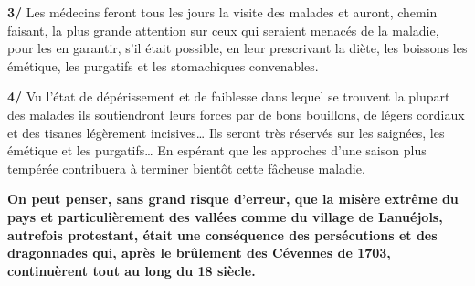 {\medskip

\textbf{3/} Les médecins feront tous les jours la visite des malades et auront, chemin faisant, la plus grande attention sur ceux qui seraient menacés de la maladie, pour les en garantir, s’il était possible, en leur prescrivant la diète, les boissons les émétique, les purgatifs et les stomachiques convenables.

\medskip

\textbf{4/} Vu l’état de dépérissement et de faiblesse dans lequel se trouvent la plupart des malades ils soutiendront leurs forces par de bons bouillons, de légers cordiaux et des tisanes légèrement incisives… Ils seront très réservés sur les saignées, les émétique et les purgatifs… En espérant que les approches d’une saison plus tempérée contribuera à terminer bientôt cette fâcheuse maladie.

\vspace{0.35em}

\begin{tcolorbox}[
  colback=white,
  colframe=black,
  boxrule=0.7pt,
  arc=0pt,
  left=6pt,right=6pt,top=5pt,bottom=5pt
]
\textbf{On peut penser, sans grand risque d’erreur, que la misère extrême du pays et particulièrement des vallées comme du village de Lanuéjols, autrefois protestant, était une conséquence des persécutions et des dragonnades qui, après le brûlement des Cévennes de 1703, continuèrent tout au long du 18\ieme{} siècle.}
\end{tcolorbox}

}


